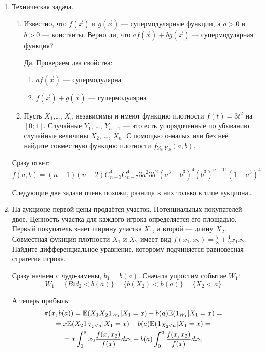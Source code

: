 \begin{enumerate}

\item Техническая задача.
\begin{enumerate}
\item Известно, что $ f(\vec{x}) $ и $ g(\vec{x}) $ — супермодулярные функции, а $ a>0 $ и $ b>0 $ — константы. Верно ли, что $ af(\vec{x})+bg(\vec{x}) $ — супермодулярная функция?

Да. Проверяем два свойства:
\begin{enumerate}
\item $ af(\vec{x}) $ — супермодулярна
\item $ f(\vec{x})+g(\vec{x}) $ — супермодулярна
\end{enumerate}

\item Пусть $ X_{1} $,\ldots, $ X_{n} $ независимы и имеют функцию плотности $ f(t)=3t^{2} $ на $ [0;1] $. Случайные $ Y_{1} $, \ldots, $ Y_{n-1} $ — это есть упорядоченные по убыванию случайные величины $ X_{2} $, \ldots, $ X_{n} $. С помощью о-малых или без неё найдите совместную функцию плотности $ f_{Y_{5},Y_{10}}(a,b) $.
\end{enumerate}

Сразу ответ: $ f(a,b)=(n-1)(n-2)C_{n-3}^{4}C_{n-7}^{4}3a^{2}3b^{2}(a^{3}-b^{3})^{4}(b^{3})^{n-11}(1-a^{3})^{4} $

Следующие две задачи очень похожи, разница в них только в типе аукциона\ldots

\item На аукционе первой цены продаётся участок. Потенциальных покупателей двое. Ценность участка для каждого игрока определяется его площадью. Первый покупатель знает ширину участка $ X_{1} $, а второй — длину $X_{2}$. Совместная фукнция плотности $ X_{1} $ и $ X_{2} $ имеет вид $ f(x_{1},x_{2})=\frac{7}{8}+\frac{1}{2}x_{1}x_{2} $. Найдите дифференциальное уравнение, которому подчиняется равновесная стратегия игрока.


Сразу начнем с чудо-замены, $ b_{1}=b(a) $. Сначала упростим событие $ W_{1} $:
\begin{equation}
W_{1}=\{Bid_{2}<b(a)\}=\{b(X_{2})<b(a)\}=\{X_{2}<a\}
\end{equation}

А теперь прибыль:
\begin{multline}
\pi(x,b(a))=\mathbb{E}(X_{1}X_{2}1_{W_{1}}|X_{1}=x)-b(a)\mathbb{E}(1_{W_{1}}|X_{1}=x)=\\
=x\mathbb{E}(X_{2}1_{X_{2}<a}|X_{1}=x)-b(a)\mathbb{E}(1_{X_{2}<a}|X_{1}=x)=\\
=x\int_{0}^{a}x_{2}\frac{f(x,x_{2})}{f(x)}dx_{2}-b(a)\int_{0}^{a}\frac{f(x,x_{2})}{f(x)}dx_{2}
\end{multline}



\end{enumerate}
